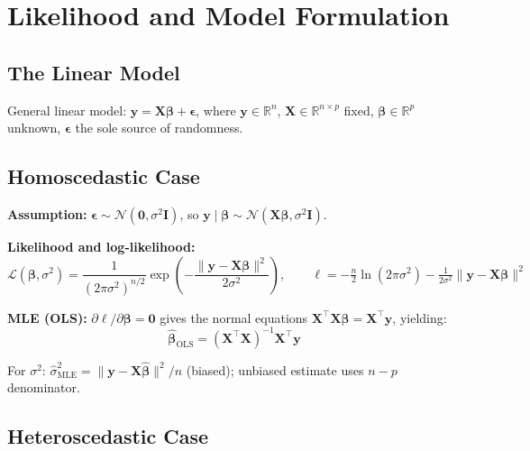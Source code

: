 \documentclass[11pt,a4paper]{article}
\begin{document}
\section{Likelihood and Model Formulation}

\subsection{The Linear Model}

General linear model: $\mathbf{y} = \mathbf{X}\boldsymbol{\beta} + \boldsymbol{\epsilon}$,
where $\mathbf{y}\!\in\!\mathbb{R}^n$, $\mathbf{X}\!\in\!\mathbb{R}^{n\times p}$ fixed,
$\boldsymbol{\beta}\!\in\!\mathbb{R}^p$ unknown, $\boldsymbol{\epsilon}$ the sole source of randomness.

\subsection{Homoscedastic Case}

\textbf{Assumption:} $\boldsymbol{\epsilon}\sim\mathcal{N}(\mathbf{0},\sigma^2\mathbf{I})$,
so $\mathbf{y}\mid\boldsymbol{\beta}\sim\mathcal{N}(\mathbf{X}\boldsymbol{\beta},\sigma^2\mathbf{I})$.

\textbf{Likelihood and log-likelihood:}
\begin{equation}
\mathcal{L}(\boldsymbol{\beta},\sigma^2)=\frac{1}{(2\pi\sigma^2)^{n/2}}
\exp\!\!\left(-\frac{\|\mathbf{y}-\mathbf{X}\boldsymbol{\beta}\|^2}{2\sigma^2}\right),\qquad
\ell=-\tfrac{n}{2}\ln(2\pi\sigma^2)-\tfrac{1}{2\sigma^2}\|\mathbf{y}-\mathbf{X}\boldsymbol{\beta}\|^2
\end{equation}

\textbf{MLE (OLS):} $\partial\ell/\partial\boldsymbol{\beta}=\mathbf{0}$ gives the normal equations
$\mathbf{X}^\top\mathbf{X}\boldsymbol{\beta}=\mathbf{X}^\top\mathbf{y}$, yielding:
\begin{equation}
\boxed{\hat{\boldsymbol{\beta}}_{\mathrm{OLS}}=(\mathbf{X}^\top\mathbf{X})^{-1}\mathbf{X}^\top\mathbf{y}}
\end{equation}

For $\sigma^2$: $\hat{\sigma}^2_{\mathrm{MLE}}=\|\mathbf{y}-\mathbf{X}\hat{\boldsymbol{\beta}}\|^2/n$ (biased);
unbiased estimate uses $n-p$ denominator.

\subsection{Heteroscedastic Case}
\end{document}
